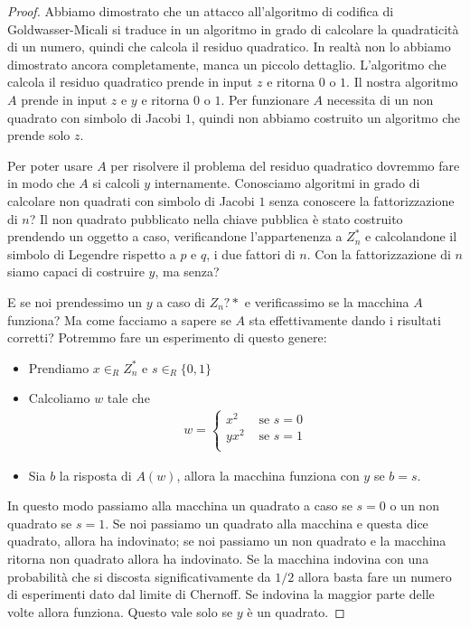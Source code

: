\begin{proof}
\noindent Abbiamo dimostrato che un attacco all'algoritmo di codifica di Goldwasser-Micali si traduce in un algoritmo in grado di calcolare la quadraticità di un numero, quindi che calcola il residuo quadratico. In realtà non lo abbiamo dimostrato ancora completamente, manca un piccolo dettaglio. L'algoritmo che calcola il residuo quadratico prende in input $z$ e ritorna $0$ o $1$. Il nostra algoritmo $A$ prende in input $z$ e $y$ e ritorna $0$ o $1$. Per funzionare $A$ necessita di un non quadrato con simbolo di Jacobi $1$, quindi non abbiamo costruito un algoritmo che prende solo $z$. 

Per poter usare $A$ per risolvere il problema del residuo quadratico dovremmo fare in modo che $A$ si calcoli $y$ internamente. Conosciamo algoritmi in grado di calcolare non quadrati con simbolo di Jacobi $1$ senza conoscere la fattorizzazione di $n$? Il non quadrato pubblicato nella chiave pubblica è stato costruito prendendo un oggetto a caso, verificandone l'appartenenza a $Z_n^*$ e calcolandone il simbolo di Legendre rispetto a $p$ e $q$, i due fattori di $n$. Con la fattorizzazione di $n$ siamo capaci di costruire $y$, ma senza?

E se noi prendessimo un $y$ a caso di $Z_n?*$ e verificassimo se la macchina $A$ funziona? Ma come facciamo a sapere se $A$ sta effettivamente dando i risultati corretti? Potremmo fare un esperimento di questo genere:
\begin{itemize}
    \item Prendiamo $x \in_R Z_n^*$ e $s \in_R \{0, 1\}$
    \item Calcoliamo $w$ tale che 
    \begin{align*}
        w = \begin{cases}
                x^2 & \text{ se } s=0\\
                yx^2 & \text{ se } s=1\\
        \end{cases}
    \end{align*}
    \item Sia $b$ la risposta di $A(w)$, allora la macchina funziona con $y$ se $b=s$.
\end{itemize}

\noindent In questo modo passiamo alla macchina un quadrato a caso se $s = 0$ o un non quadrato se $s=1$. Se noi passiamo un quadrato alla macchina e questa dice quadrato, allora ha indovinato; se noi passiamo un non quadrato e la macchina ritorna non quadrato allora ha indovinato. Se la macchina indovina con una probabilità che si discosta significativamente da $1/2$ allora basta fare un numero di esperimenti dato dal limite di Chernoff. Se indovina la maggior parte delle volte allora funziona. Questo vale solo se $y$ è un quadrato.


\end{proof}
